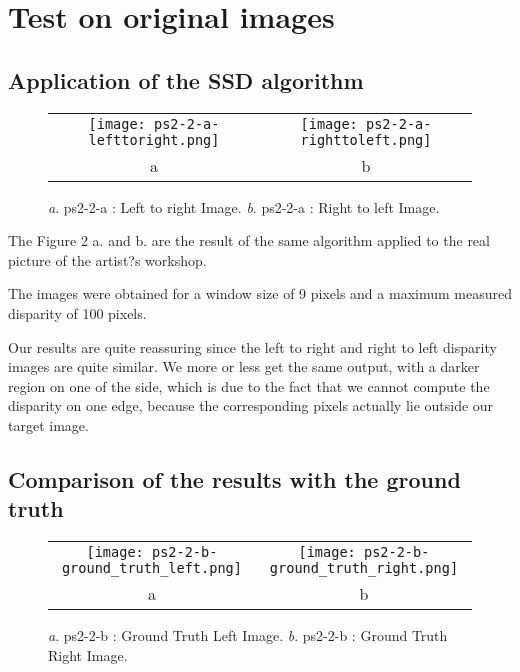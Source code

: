 \documentclass[a4paper,11pt]{article}
\begin{document}
\section{Test on original images}

\subsection{Application of the SSD algorithm}



 \begin{figure}[H]
\begin{center}
\begin{tabular}{cc}
	\texttt{[image: ps2-2-a-lefttoright.png]}&
	\texttt{[image: ps2-2-a-righttoleft.png]}\\
	a&b
\end{tabular}
\end{center}
\caption{ 
\textit{a}. ps2-2-a : Left to right Image.  \textit{b}. ps2-2-a : Right to left Image. }
\label{ps2-1}
\end{figure}

The Figure 2 a. and b. are the result of the same algorithm applied to the real picture of the artist?s workshop.

The images were obtained for a window size of 9 pixels and a maximum measured disparity of 100 pixels.

Our results are quite reassuring since the left to right and right to left disparity images are quite similar. We more or less get the same output, with a darker region on one of the side, which is due to the fact that we cannot compute the disparity on one edge, because the corresponding pixels actually lie outside our target image.

\subsection{Comparison of the results with the ground truth}

 \begin{figure}[H]
\begin{center}
\begin{tabular}{cc}
	\texttt{[image: ps2-2-b-ground\_truth\_left.png]}&
	\texttt{[image: ps2-2-b-ground\_truth\_right.png]}\\
	a&b
\end{tabular}
\end{center}
\caption{ 
\textit{a}. ps2-2-b : Ground Truth Left Image.  \textit{b}.  ps2-2-b : Ground Truth Right Image. }
\label{ps2-1}
\end{figure}
\end{document}
